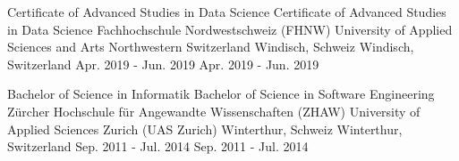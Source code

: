{
}

\begin{cventries}

  	\cventry
  	{
  			{ Certificate of Advanced Studies in Data Science }
  			{ Certificate of Advanced Studies in Data Science }
  	} %
  	{
  			{ Fachhochschule Nordwestschweiz (FHNW) }
  			{ University of Applied Sciences and Arts Northwestern Switzerland }
  	} %
  	{
  			{ Windisch, Schweiz }
  			{ Windisch, Switzerland }
  	} %
  	{
  			{ Apr. 2019 - Jun. 2019 }
  			{ Apr. 2019 - Jun. 2019 }
  	} %
  	{
  	}
  
  	\cventry
    {
    		{ Bachelor of Science in Informatik }
    		{ Bachelor of Science in Software Engineering }
    } %
    {
    		{ Zürcher Hochschule für Angewandte Wissenschaften (ZHAW) }
    		{ University of Applied Sciences Zurich (UAS Zurich) }
    } %
    {
    		{ Winterthur, Schweiz }
    		{ Winterthur, Switzerland }
    } %
    {
     		{ Sep. 2011 - Jul. 2014 }
    		{ Sep. 2011 - Jul. 2014 }
    } %
    {
    }


\end{cventries}
